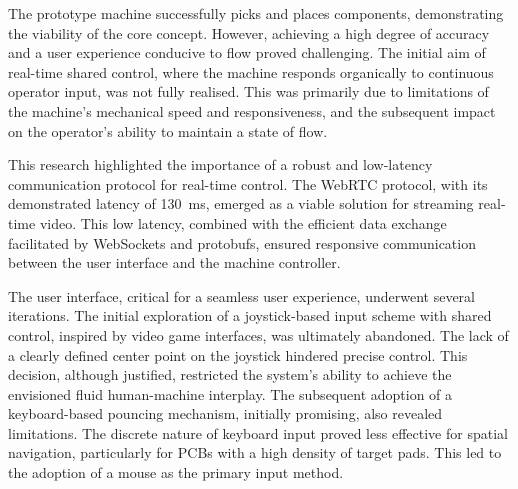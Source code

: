 \documentclass[12pt,british,UKenglish]{article}
\begin{document}


The prototype machine successfully picks and places components, demonstrating the viability of the core concept.
However, achieving a high degree of accuracy and a user experience conducive to flow proved challenging.
The initial aim of real-time shared control, where the machine responds organically to continuous operator input, was not fully realised.
This was primarily due to limitations of the machine's mechanical speed and responsiveness, and the subsequent impact on the operator's ability to maintain a state of flow.

This research highlighted the importance of a robust and low-latency communication protocol for real-time control.
The \ac{WebRTC} protocol, with its demonstrated latency of \qty{130}{\milli\second}, emerged as a viable solution for streaming real-time video.
This low latency, combined with the efficient data exchange facilitated by WebSockets and \Aclp{protobuf}, ensured responsive communication between the user interface and the machine controller.

The user interface, critical for a seamless user experience, underwent several iterations.
The initial exploration of a joystick-based input scheme with shared control, inspired by video game interfaces, was ultimately abandoned.
The lack of a clearly defined center point on the joystick hindered precise control.
This decision, although justified, restricted the system's ability to achieve the envisioned fluid human-machine interplay.
The subsequent adoption of a keyboard-based pouncing mechanism, initially promising, also revealed limitations.
The discrete nature of keyboard input proved less effective for spatial navigation, particularly for \acp{PCB} with a high density of target pads.
This led to the adoption of a mouse as the primary input method.
\end{document}
